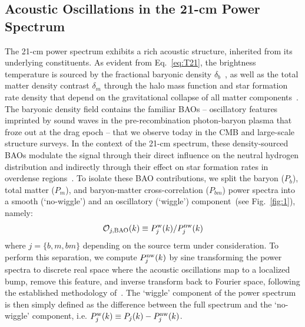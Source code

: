 \documentclass[floats,floatfix,showpacs,amssymb,prd,twocolumn,superscriptaddress,nofootinbib,reprint,preprintnumbers]{revtex4-2}
\begin{document}
\subsection{Acoustic Oscillations in the 21-cm Power Spectrum}

\noindent The 21-cm power spectrum exhibits a rich acoustic structure, inherited from its underlying constituents. As evident from Eq.~\eqref{eq:T21}, the brightness temperature is sourced by the fractional baryonic density $\delta_b$~\citep{Furlanetto:2006jb, Pritchard:2008da, Pritchard:2010pa, pritchard12}, as well as the total matter density contrast $\delta_m$ through the halo mass function and star formation rate density that depend on the gravitational collapse of all matter components~\citep{Cruz:2024fsv}. The baryonic density field contains the familiar BAOs -- oscillatory features imprinted by sound waves in the pre-recombination photon-baryon plasma that froze out at the drag epoch -- that we observe today in the CMB and large-scale structure surveys. In the context of the 21-cm spectrum, these density-sourced BAOs modulate the signal through their direct influence on the neutral hydrogen distribution and indirectly through their effect on star formation rates in overdense regions~\citep{tseliakhovich10, dalal10}.  To isolate these BAO contributions, we split the baryon ($P_b$), total matter ($P_m$), and baryon-matter cross-correlation ($P_{bm}$) power spectra into a smooth (`no-wiggle') and an oscillatory (`wiggle') component~(see Fig.~\ref{fig:1}), namely:
\begin{equation}
    \mathcal{O}_{j,\rm BAO}(k)\equiv P_{j}^{\rm w}(k)/P_{j}^{\rm nw}(k)
\end{equation}
where $j=\{b,m,bm\}$ depending on the source term under consideration. To perform this separation, we compute $P_j^{\rm nw}(k)$ by sine transforming the power spectra to discrete real space where the acoustic oscillations map to a localized bump, remove this feature, and inverse transform back to Fourier space, following the established methodology of~\cite{Hamann:2010pw,Baumann:2017gkg}. The `wiggle' component of the power spectrum is then simply defined as the difference between the full spectrum and the `no-wiggle' component, i.e. $P_j^{\rm w}(k)\equiv P_j(k)-P^{\rm nw}_j(k)$.
\end{document}
